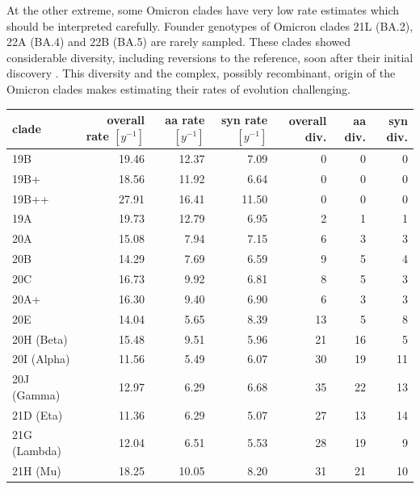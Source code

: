 \documentclass[aps,rmp, twocolumn]{revtex4}
\begin{document}
At the other extreme, some Omicron clades have very low rate estimates which should be interpreted carefully.
Founder genotypes of Omicron clades 21L (BA.2), 22A (BA.4) and 22B (BA.5) are rarely sampled.
These clades showed considerable diversity, including reversions to the reference, soon after their initial discovery \citep{tegally_emergence_2022}.
This diversity and the complex, possibly recombinant, origin of the Omicron clades makes estimating their rates of evolution challenging.


\begin{table}
\begin{tabular}{l|rrrrrr}
    \hline
    {\bf clade} &  overall rate $[y^{-1}]$ & aa rate $[y^{-1}]$ &  syn rate $[y^{-1}]$ & overall div. &  aa div. &  syn div. \\
    \hline
    19B &     19.46 &    12.37 &      7.09 &        0 &       0 &        0 \\
   19B+ &     18.56 &    11.92 &      6.64 &        0 &       0 &        0 \\
  19B++ &     27.91 &    16.41 &     11.50 &        0 &       0 &        0 \\
  19A &     19.73 &    12.79 &      6.95 &        2 &       1 &        1 \\
  20A &     15.08 &     7.94 &      7.15 &        6 &       3 &        3 \\
    20B &     14.29 &     7.69 &      6.59 &        9 &       5 &        4 \\
    20C &     16.73 &     9.92 &      6.81 &        8 &       5 &        3 \\
   20A+ &     16.30 &     9.40 &      6.90 &        6 &       3 &        3 \\
    20E &     14.04 &     5.65 &      8.39 &       13 &       5 &        8 \\
    20H (Beta) &     15.48 &     9.51 &      5.96 &       21 &      16 &        5 \\
    20I (Alpha) &     11.56 &     5.49 &      6.07 &       30 &      19 &       11 \\
    20J (Gamma) &     12.97 &     6.29 &      6.68 &       35 &      22 &       13 \\
    21D (Eta) &     11.36 &     6.29 &      5.07 &       27 &      13 &       14 \\
    21G (Lambda) &     12.04 &     6.51 &      5.53 &       28 &      19 &        9 \\
    21H (Mu) &     18.25 &    10.05 &      8.20 &       31 &      21 &       10 \\

\end{tabular}
\end{table}
\end{document}
